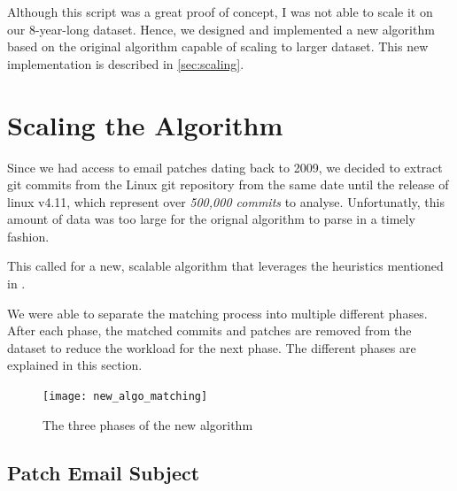 
Although this script was a great proof of concept, I was not able to scale it on our 8-year-long dataset. Hence, we designed and implemented a new algorithm based on the original algorithm capable of scaling to larger dataset. This new implementation is described in \autoref{sec:scaling}.




\section{Scaling the Algorithm}
\label{sec:scaling}

Since we had access to email patches dating back to 2009, we decided to extract git commits from the Linux git repository from the same date until the release of linux v4.11, which represent over \textit{500,000 commits} to analyse. Unfortunatly, this amount of data was too large for the orignal algorithm to parse in a timely fashion.

This called for a new, scalable algorithm that leverages the heuristics mentioned in \citep{msr13jojo,jiang14}.

We were able to separate the matching process into multiple different phases. After each phase, the matched commits and patches are removed from the dataset to reduce the workload for the next phase. The different phases are explained in this section. 

\begin{figure}[htb]
\centering
\texttt{[image: new\_algo\_matching]}
\caption{The three phases of the new algorithm}
\label{fig:new_algo_matching}
\end{figure}

\subsection{Patch Email Subject}

